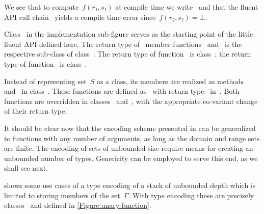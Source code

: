 We see that to compute~$f(r₁,s₁)$ at compile time we write~
  and that the fluent API call chain~ yields
  a compile time error since~$f(r₂, s₂)=⊥$.

Class~ in the implementation sub-figure serves as
  the starting point of the little fluent API defined here.
The return type of~ member functions~ and~
  is the respective sub-class of class~:
The return type of function~ is class~;
  the return type of function~ is class~.

Instead of representing set~$S$ as a class,
  its members are realized as methods~ and~ in class~.
These functions are defined as~ with return type~
  in~.
Both functions are overridden in classes~ and~,
   with the appropriate co-variant change of their return type,

It should be clear now that the encoding scheme presented
  in  can be generalized to functions
  with any number of arguments, as long as the domain and range sets are finite.
The encoding of sets of unbounded size require means for creating an unbounded
 number of types.
Genericity can be employed to serve this end, as we shall see next.



 shows some use cases of a type encoding of a stack of unbounded depth
  which is limited to storing members of the set~$Γ$.
With type encoding these are precisely classes~
  and  defined in \cref{Figure:unary-function}.

